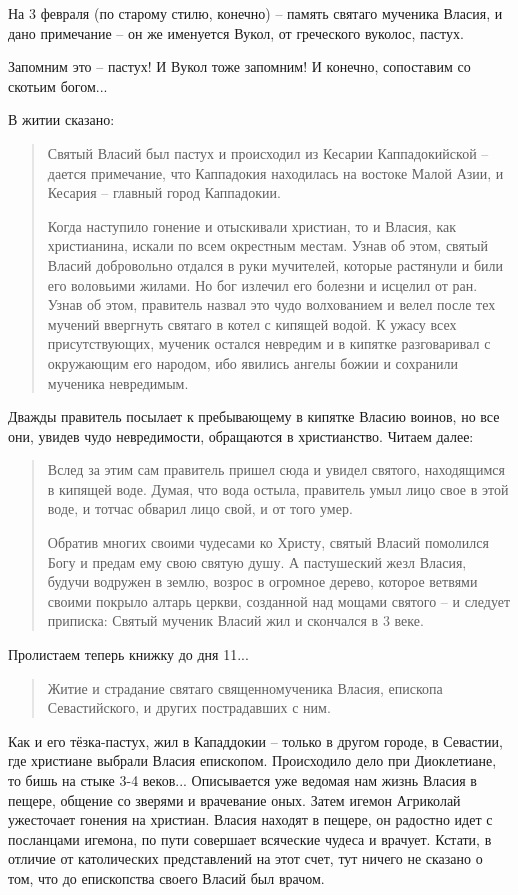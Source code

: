    На 3 февраля (по старому стилю, конечно) – память святаго мученика Власия, и дано примечание – он же именуется Вукол, от греческого вуколос, пастух.

   Запомним это – пастух! И Вукол тоже запомним! И конечно, сопоставим со скотьим богом...

   В житии сказано:

\begin{quotation}
Святый Власий был пастух и происходил из Кесарии Каппадокийской – дается примечание, что Каппадокия находилась на востоке Малой Азии, и Кесария – главный город Каппадокии.

   Когда наступило гонение и отыскивали христиан, то и Власия, как христианина, искали по всем окрестным местам. Узнав об этом, святый Власий добровольно отдался в руки мучителей, которые растянули и били его воловьими жилами. Но бог излечил его болезни и исцелил от ран. Узнав об этом, правитель назвал это чудо волхованием и велел после тех мучений ввергнуть святаго в котел с кипящей водой. К ужасу всех присутствующих, мученик остался невредим и в кипятке разговаривал с окружающим его народом, ибо явились ангелы божии и сохранили мученика невредимым. 
\end{quotation}

Дважды правитель посылает к пребывающему в кипятке Власию воинов, но все они, увидев чудо невредимости, обращаются в христианство. Читаем далее:

\begin{quotation}
Вслед за этим сам правитель пришел сюда и увидел святого, находящимся в кипящей воде. Думая, что вода остыла, правитель умыл лицо свое в этой воде, и тотчас обварил лицо свой, и от того умер.

   Обратив многих своими чудесами ко Христу, святый Власий помолился Богу и предам ему свою святую душу. А пастушеский жезл Власия, будучи водружен в землю, возрос в огромное дерево, которое ветвями своими покрыло алтарь церкви, созданной над мощами святого – и следует приписка: Святый мученик Власий жил и скончался в 3 веке.
\end{quotation}

Пролистаем теперь книжку до дня 11...

\begin{quotation}
Житие и страдание святаго священномученика Власия, епископа Севастийского, и других пострадавших с ним.
\end{quotation}

   Как и его тёзка-пастух, жил в Кападдокии – только в другом городе, в Севастии, где христиане выбрали Власия епископом. Происходило дело при Диоклетиане, то бишь на стыке 3-4 веков... Описывается уже ведомая нам жизнь Власия в пещере, общение со зверями и врачевание оных. Затем игемон Агриколай ужесточает гонения на христиан. Власия находят в пещере, он радостно идет с посланцами игемона, по пути совершает всяческие чудеса и врачует. Кстати, в отличие от католических представлений на этот счет, тут ничего не сказано о том, что до епископства своего Власий был врачом. 

